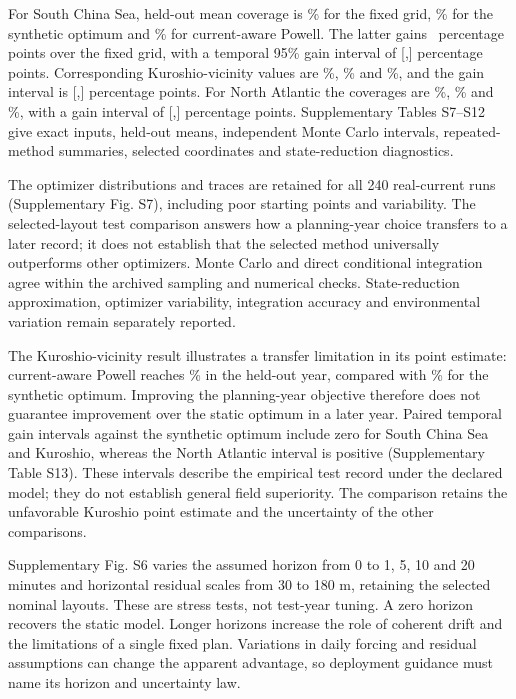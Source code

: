 \documentclass[fleqn,10pt]{wlscirep}
\begin{document}
For South China Sea, held-out mean coverage is \OceanSCSFixed\% for the fixed grid, \OceanSCSSynthetic\% for the synthetic optimum and \OceanSCSOpt\% for current-aware Powell. The latter gains \OceanSCSGain\ percentage points over the fixed grid, with a temporal 95\% gain interval of [\OceanSCSGainLow,\OceanSCSGainHigh] percentage points. Corresponding Kuroshio-vicinity values are \OceanKuroFixed\%, \OceanKuroSynthetic\% and \OceanKuroOpt\%, and the gain interval is [\OceanKuroGainLow,\OceanKuroGainHigh] percentage points. For North Atlantic the coverages are \OceanNAFixed\%, \OceanNASynthetic\% and \OceanNAOpt\%, with a gain interval of [\OceanNAGainLow,\OceanNAGainHigh] percentage points. Supplementary Tables S7--S12 give exact inputs, held-out means, independent Monte Carlo intervals, repeated-method summaries, selected coordinates and state-reduction diagnostics.

The optimizer distributions and traces are retained for all 240 real-current runs (Supplementary Fig. S7), including poor starting points and variability. The selected-layout test comparison answers how a planning-year choice transfers to a later record; it does not establish that the selected method universally outperforms other optimizers. Monte Carlo and direct conditional integration agree within the archived sampling and numerical checks. State-reduction approximation, optimizer variability, integration accuracy and environmental variation remain separately reported.

The Kuroshio-vicinity result illustrates a transfer limitation in its point estimate: current-aware Powell reaches \OceanKuroOpt\% in the held-out year, compared with \OceanKuroSynthetic\% for the synthetic optimum. Improving the planning-year objective therefore does not guarantee improvement over the static optimum in a later year. Paired temporal gain intervals against the synthetic optimum include zero for South China Sea and Kuroshio, whereas the North Atlantic interval is positive (Supplementary Table S13). These intervals describe the empirical test record under the declared model; they do not establish general field superiority. The comparison retains the unfavorable Kuroshio point estimate and the uncertainty of the other comparisons.

Supplementary Fig. S6 varies the assumed horizon from 0 to 1, 5, 10 and 20 minutes and horizontal residual scales from 30 to 180 m, retaining the selected nominal layouts. These are stress tests, not test-year tuning. A zero horizon recovers the static model. Longer horizons increase the role of coherent drift and the limitations of a single fixed plan. Variations in daily forcing and residual assumptions can change the apparent advantage, so deployment guidance must name its horizon and uncertainty law.
\end{document}

